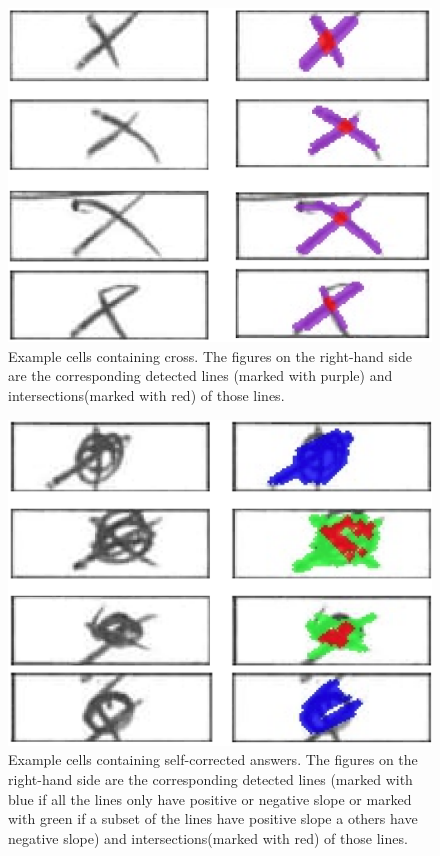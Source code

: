 \documentclass[a4paper,twoside]{article}
\begin{document}
\begin{figure}[!h]
  \centering
  \includegraphics[width=\columnwidth]{Latex/imgs/Crosses_examples.png}
  \caption{Example cells containing cross. The figures on the right-hand side are the corresponding detected lines (marked with purple) and intersections(marked with red) of those lines.}
  \label{fig: Example_cells_cross}
 \end{figure}
\begin{figure}[!h]
  \centering
  \includegraphics[width=\columnwidth]{Latex/imgs/self_corrected_ansers_example.png}
  \caption{Example cells containing self-corrected answers. The figures on the right-hand side are the corresponding detected lines (marked with blue if all the lines only have positive or negative slope or marked with green if a subset of the  lines have positive slope a others have negative slope) and intersections(marked with red) of those lines.}
  \label{fig: Example_cells_self_corrected_answers}
 \end{figure}
\end{document}
